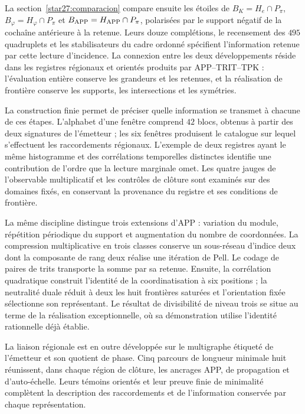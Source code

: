 La section~\ref{star27:comparacion} compare ensuite les étoiles de
\(B_K=H_e\cap P_\pi\), \(B_\varphi=H_\varphi\cap P_\pi\) et
\(B_{\rm APP}=H_{\rm APP}\cap P_\pi\), polarisées par le support
négatif de la cochaîne antérieure à la retenue. Leurs douze complétions,
le recensement des \(495\) quadruplets et les stabilisateurs du cadre
ordonné spécifient l'information retenue par cette lecture
d'incidence. La connexion entre les deux développements réside dans les
registres régionaux et orientés produits par APP--TRIT--TPK :
l'évaluation entière conserve les grandeurs et les retenues, et la réalisation
de frontière conserve les supports, les intersections et les symétries.



La construction finie permet de préciser quelle information se transmet à
chacune de ces étapes. L'alphabet d'une fenêtre comprend \(42\)
blocs, obtenus à partir des deux signatures de l'émetteur ; les six fenêtres produisent
le catalogue sur lequel s'effectuent les raccordements régionaux. L'exemple
de deux registres ayant le même histogramme et des corrélations temporelles distinctes
identifie une contribution de l'ordre que la lecture marginale omet. Les
quatre jauges de l'observable multiplicatif et les contrôles de clôture
sont examinés sur des domaines fixés, en conservant la provenance du registre
et ses conditions de frontière.

La même discipline distingue trois extensions d'APP : variation du
module, répétition périodique du support et augmentation du nombre de
coordonnées. La compression multiplicative en trois classes conserve un
sous-réseau d'indice deux dont la composante de rang deux réalise une
itération de Pell. Le codage de paires de trits transporte la somme
par sa retenue. Ensuite, la corrélation quadratique construit
l'identité de la coordinatisation à six positions ; la neutralité duale réduit
à deux les huit frontières saturées et l'orientation fixée sélectionne son
représentant. Le résultat de divisibilité de niveau trois se situe au
terme de la réalisation exceptionnelle, où sa démonstration utilise
l'identité rationnelle déjà établie.

La liaison régionale est en outre développée sur le multigraphe étiqueté de l'émetteur et son quotient de phase. Cinq parcours de longueur minimale huit réunissent, dans chaque région de clôture, les ancrages APP, de propagation et d'auto-échelle. Leurs témoins orientés et leur preuve finie de minimalité complètent la description des raccordements et de l'information conservée par chaque représentation.


